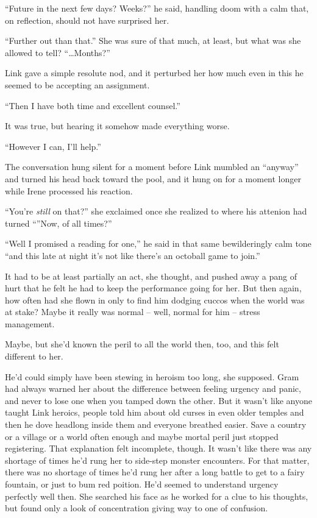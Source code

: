 \documentclass[../FGP.tex]{subfiles}
\begin{document}
``Future in the next few days? Weeks?'' he said, handling doom with a calm that, on reflection, should not have surprised her.

``Further out than that.'' She was sure of that much, at least, but what was she allowed to tell? ``\ldots Months?''

Link gave a simple resolute nod, and it perturbed her how much even in this he seemed to be accepting an assignment. 

``Then I have both time and excellent counsel.'' 

It was true, but hearing it somehow made everything worse.%

``However I can, I'll help.''

The conversation hung silent for a moment before Link mumbled an ``anyway'' and turned his head back toward the pool, and it hung on for a moment longer while Irene processed his reaction. 

``You're \emph{still} on that?'' she exclaimed once she realized to where his attenion had turned ``''Now, of all times?'' 

``Well I promised a reading for one,'' he said in that same bewilderingly calm tone ``and this late at night it's not like there's an octoball game to join.''

It had to be at least partially an act, she thought, and pushed away a pang of hurt that he felt he had to keep the performance going for her. But then again, how often had she flown in only to find him dodging cuccos when the world was at stake? Maybe it really was normal -- well, normal for him -- stress management.

Maybe, but she'd known the peril to all the world then, too, and this felt different to her.

He'd could simply have been stewing in heroism too long, she supposed. Gram had always warned her about the difference between feeling urgency and panic, and never to lose one when you tamped down the other. But it wasn't like anyone taught Link heroics, people told him about old curses in even older temples and then he dove headlong inside them and everyone breathed easier. Save a country or a village or a world often enough and maybe mortal peril just stopped registering. That explanation felt incomplete, though. It wasn't like there was any shortage of times he'd rung her to side-step monster encounters. For that matter, there was no shortage of times he'd rung her after a long battle to get to a fairy fountain, or just to bum red poition. He'd seemed to understand urgency perfectly well then. She searched his face as he worked for a clue to his thoughts, but found only a look of concentration giving way to one of confusion.
\end{document}
